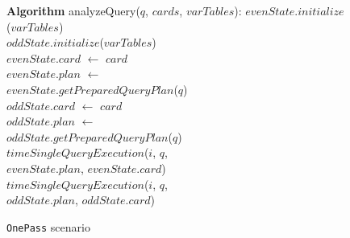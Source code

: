\documentclass[conference]{IEEEtran}
\begin{document}
\begin{figure}[t]
\begin{center}
\begin{algorithmic}
{\bf Algorithm} analyzeQuery($q$, $cards$, $varTables$): 
\STATE $evenState$.$initialize$($varTables$) \\
\STATE $oddState$.$initialize$($varTables$) \\
                \STATE $evenState$.$card$ $\leftarrow$ $card$ \\
        \STATE $evenState$.$plan$ $\leftarrow$ \\
        		\hspace{14.0mm}$evenState$.$getPreparedQueryPlan$($q$) \\
    \ELSE
            \STATE $oddState$.$card$ $\leftarrow$ $card$ \\
            \STATE $oddState$.$plan$ $\leftarrow$\\
            \hspace{14.0mm} $oddState$.$getPreparedQueryPlan$($q$) \\
    \ENDIF
                                \STATE $timeSingleQueryExecution$($i$, $q$,  \\
                                                \hspace{14.0mm}$evenState$.$plan$, $evenState$.$card$) \\
                        \ENDFOR
                \ENDIF
                                \STATE $timeSingleQueryExecution$($i$, $q$,  \\
                                                \hspace{14.0mm}$oddState$.$plan$, $oddState$.$card$) \\
                        \ENDFOR
                \ENDIF
        \ENDIF
\ENDFOR
\end{algorithmic}
\caption{ {\tt OnePass} scenario\label{alg:onepass}}
\end{center}
\end{figure}
\end{document}
